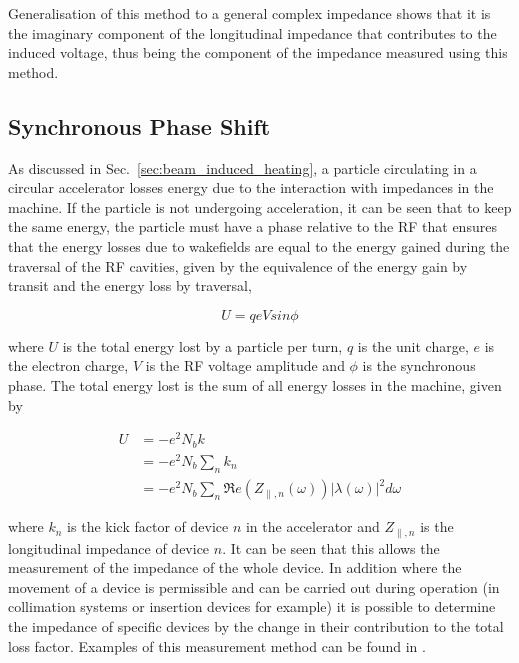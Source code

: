 Generalisation of this method to a general complex impedance shows that it is the imaginary component of the longitudinal impedance that contributes to the induced voltage, thus being the component of the impedance measured using this method.

\subsection{Synchronous Phase Shift}
\label{sec:syn-phase-shift}

As discussed in Sec.~\ref{sec:beam_induced_heating}, a particle circulating in a circular accelerator losses energy due to the interaction with impedances in the machine. If the particle is not undergoing acceleration, it can be seen that to keep the same energy, the particle must have a phase relative to the RF that ensures that the energy losses due to wakefields are equal to the energy gained during the traversal of the RF cavities, given by the equivalence of the energy gain by transit and the energy loss by traversal,

\begin{equation}
U = qeVsin\phi
\end{equation}

where $U$ is the total energy lost by a particle per turn, $q$ is the unit charge, $e$ is the electron charge, $V$ is the RF voltage amplitude and $\phi$ is the synchronous phase. The total energy lost is the sum of all energy losses in the machine, given by

\begin{align}
U & = -e^{2}N_{b}k \\
   & = -e^{2}N_{b}\displaystyle\sum\limits_{n} k_{n} \\
   & = -e^{2}N_{b}\displaystyle\sum\limits_{n} \Re{}e\left( Z_{\parallel,n}\left( \omega \right) \right)\left| \lambda \left( \omega \right) \right|^{2} d\omega
\end{align}

where $k_{n}$ is the kick factor of device $n$ in the accelerator and $ Z_{\parallel,n}$ is the longitudinal impedance of device $n$. It can be seen that this allows the measurement of the impedance of the whole device. In addition where the movement of a device is permissible and can be carried out during operation (in collimation systems or insertion devices for example) it is possible to determine the impedance of specific devices by the change in their contribution to the total loss factor. Examples of this measurement method can be found in \cite{Bohl:SingleBunchEnLoss, Argyropoulos:longImpInj}.

